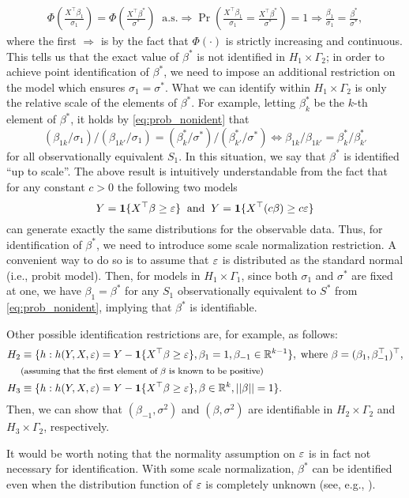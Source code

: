 \documentclass[11pt, A4paper, openany, uplatex]{book}
\begin{document}
\begin{example}
\begin{align}\label{eq:prob_nonident}
	\Phi \left( \frac{X^\top \beta_1}{\sigma_1} \right) = \Phi \left( \frac{X^\top \beta^*}{\sigma^*} \right ) \;\; \text{a.s.}
	\Longrightarrow \Pr\left(\frac{X^\top \beta_1}{\sigma_1} = \frac{X^\top \beta^*}{\sigma^*}\right) = 1
	\Longrightarrow \frac{\beta_1}{\sigma_1} = \frac{\beta^*}{\sigma^*},
\end{align}
where the first $\Longrightarrow$ is by the fact that $\Phi(\cdot)$ is strictly increasing and continuous.
This tells us that the exact value of $\beta^*$ is not identified in $H_1 \times \Gamma_2$; in order to achieve point identification of $\beta^*$, we need to impose an additional restriction on the model which ensures $\sigma_1 = \sigma^*$.
What we can identify within $H_1 \times \Gamma_2$ is only the relative scale of the elements of $\beta^*$.
For example, letting $\beta_{k}^*$ be the $k$-th element of $\beta^*$, it holds by \eqref{eq:prob_nonident} that
\[
	(\beta_{1k}/\sigma_1)/(\beta_{1k'}/\sigma_1) = (\beta_{k}^*/\sigma^*)/(\beta_{k'}^*/\sigma^*) \iff \beta_{1k}/\beta_{1k'} = \beta_{k}^*/\beta_{k'}^*
\]
for all observationally equivalent $S_1$.
In this situation, we say that  $\beta^*$ is identified ``up to scale''.
The above result is intuitively understandable from the fact that for any constant $c > 0$ the following two models
\[
	Y = \mathbf{1}\{ X^\top \beta \ge \varepsilon \} \;\; \text{and} \;\; Y = \mathbf{1}\{ X^\top(c \beta) \ge c\varepsilon\}
\]
can generate exactly the same distributions for the observable data.
Thus, for identification of  $\beta^*$, we need to introduce some scale normalization restriction.
A convenient way to do so is to assume that $\varepsilon$ is distributed as the standard normal (i.e., probit model).
Then, for models in $H_1 \times \Gamma_1$, since both $\sigma_1$ and $\sigma^*$ are fixed at one, we have $\beta_1 =  \beta^*$ for any $S_1$ observationally equivalent to $S^*$ from \eqref{eq:prob_nonident}, implying that  $\beta^*$ is identifiable.

Other possible identification restrictions are, for example, as follows:
\begin{align*}
	H_2 
	& \equiv \{h : h(Y, X, \varepsilon) = Y - \mathbf{1}\{ X^\top \beta \ge \varepsilon\} ,  \beta_1 = 1,  \beta_{-1} \in \mathbb{R}^{k-1}\}, \; \text{where }  \beta = ( \beta_1,  \beta^\top_{-1})^\top,\\
	& \footnotesize{\text{(assuming that the first element of  $\beta$ is known to be positive)}} \\
	H_3
	& \equiv \{h : h(Y, X, \varepsilon) = Y - \mathbf{1}\{ X^\top \beta \ge \varepsilon \} , \beta \in \mathbb{R}^k, || \beta|| = 1\}.
\end{align*}
Then, we can show that $( \beta_{-1}, \sigma^2)$ and $(\beta, \sigma^2)$ are identifiable in $H_2 \times \Gamma_2$ and $H_3 \times \Gamma_2$, respectively.

It would be worth noting that the normality assumption on $\varepsilon$ is in fact not necessary for identification.
With some scale normalization,  $\beta^*$ can be identified even when the distribution function of $\varepsilon$ is completely unknown (see, e.g., \cite{manski1975maximum}).
\end{example}
\end{document}
